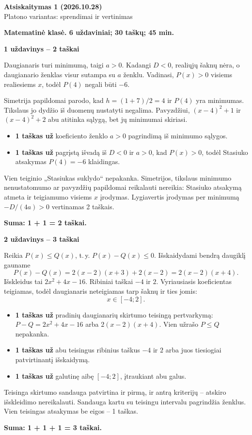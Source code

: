 \documentclass[11pt]{article}
\newcommand{\sk}[1]{\par\medskip\textbf{#1}\par}
\begin{document}
\setlength{\abovedisplayskip}{6pt}\setlength{\belowdisplayskip}{6pt}
\begin{center}\Large\textbf{Atsiskaitymas 1 (2026.10.28)}\\\large Platono variantas: sprendimai ir vertinimas\end{center}
\textbf{Matematinė klasė. 6 uždaviniai; 30 taškų; 45 min.}

\sk{1 uždavinys -- 2 taškai}
Daugianaris turi minimumą, taigi $a>0$. Kadangi $D<0$, realiųjų šaknų nėra, o daugianario ženklas visur sutampa su $a$ ženklu. Vadinasi, $P(x)>0$ visiems realiesiems $x$, todėl $P(4)$ negali būti $-6$.

Simetrija papildomai parodo, kad $h=(1+7)/2=4$ ir $P(4)$ yra minimumas. Tikslaus jo dydžio iš duomenų nustatyti negalima. Pavyzdžiui, $(x-4)^2+1$ ir $(x-4)^2+2$ abu atitinka sąlygą, bet jų minimumai skiriasi.
\begin{itemize}
\item \textbf{1 taškas už} koeficiento ženklo $a>0$ pagrindimą iš minimumo sąlygos.
\item \textbf{1 taškas už} pagrįstą išvadą iš $D<0$ ir $a>0$, kad $P(x)>0$, todėl Stasiuko atsakymas $P(4)=-6$ klaidingas.
\end{itemize}
Vien teiginio „Stasiukas suklydo“ nepakanka. Simetrijos, tikslaus minimumo nenustatomumo ar pavyzdžių papildomai reikalauti nereikia: Stasiuko atsakymą atmeta ir teigiamumo visiems $x$ įrodymas. Lygiavertis įrodymas per minimumą $-D/(4a)>0$ vertinamas 2 taškais.\par\textbf{Suma: 1 + 1 = 2 taškai.}

\sk{2 uždavinys -- 3 taškai}
Reikia $P(x)\le Q(x)$, t.\,y. $P(x)-Q(x)\le0$. Išskaidydami bendrą daugiklį gauname
\[P(x)-Q(x)=2(x-2)(x+3)+2(x-2)=2(x-2)(x+4).\]
Išskleidus tai $2 x^{2} + 4 x - 16$. Ribiniai taškai $-4$ ir $2$. Vyriausiasis koeficientas teigiamas, todėl daugianaris neteigiamas tarp šaknų ir ties jomis:
\[\boxed{x\in[-4;2]}.\]
\begin{itemize}
\item \textbf{1 taškas už} pradinių daugianarių skirtumo teisingą pertvarkymą: $P-Q=2 x^{2} + 4 x - 16$ arba $2(x-2)(x+4)$. Vien užrašo $P\le Q$ nepakanka.
\item \textbf{1 taškas už} abu teisingus ribinius taškus $-4$ ir $2$ arba juos tiesiogiai patvirtinantį išskaidymą.
\item \textbf{1 taškas už} galutinę aibę $[-4;2]$, įtraukiant abu galus.
\end{itemize}
Teisinga skirtumo sandauga patvirtina ir pirmą, ir antrą kriterijų -- atskiro išskleidimo nereikalauti. Sandauga kartu su teisingu intervalu pagrindžia ženklus. Vien teisingas atsakymas be eigos -- 1 taškas.\par\textbf{Suma: 1 + 1 + 1 = 3 taškai.}\newpage
\end{document}
